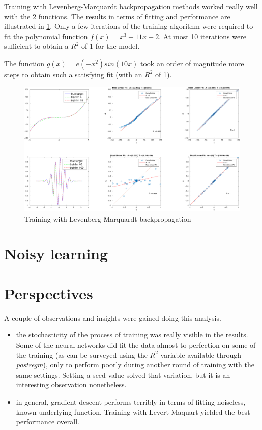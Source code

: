\documentclass[11pt, a4paper]{article}
\begin{document}
Training with Levenberg-Marquardt backpropagation methods worked
really well with the 2 functions. The results in terms of fitting and
performance are illustrated in \ref{fig:trainll}. Only a few
iterations of the training algorithm were required to fit the
polynomial function $f(x)=x^3-11x+2$. At most 10 iterations were
sufficient to obtain a $R^2$ of 1 for the model.

The function $g(x)=e(-x^2)sin(10x)$ took an order of magnitude more
steps to obtain such a satisfying fit (with an $R^2$ of 1).

\begin{figure}[H]
  \includegraphics[scale=.43]{trainlm.pdf}
  \caption{Training with Levenberg-Marquardt backpropagation}  
  \label{fig:trainll}
\end{figure}

\section{Noisy learning}

\section{Perspectives}

A couple of observations and insights were gained doing this analysis. 

\begin{itemize}
\item the stochasticity of the process of training was really visible
  in the results. Some of the neural networks did fit the data almost
  to perfection on some of the training (as can be surveyed using the
  $R^2$ variable available through \emph{postregm}), only to perform
  poorly during another round of training with the same
  settings. Setting a seed value solved that variation, but it is an
  interesting observation nonetheless.
\item in general, gradient descent performs terribly in terms of
  fitting noiseless, known underlying function. Training with
  Levert-Maquart yielded the best performance overall.
\end{itemize}

 

\end{document}
